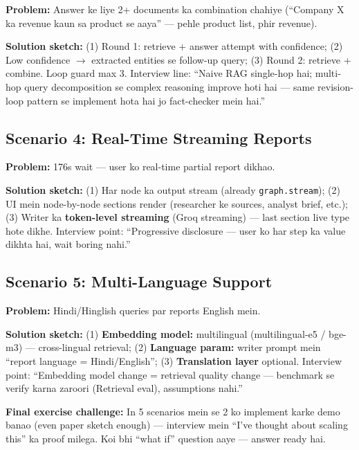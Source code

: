 \begin{conceptbox}
\textbf{Problem:} Answer ke liye 2+ documents ka combination chahiye (``Company X ka revenue kaun sa product se aaya'' --- pehle product list, phir revenue).

\textbf{Solution sketch:} (1) Round 1: retrieve + answer attempt with confidence; (2) Low confidence $\rightarrow$ extracted entities se follow-up query; (3) Round 2: retrieve + combine. Loop guard max 3. Interview line: ``Naive RAG single-hop hai; multi-hop query decomposition se complex reasoning improve hoti hai --- same revision-loop pattern se implement hota hai jo fact-checker mein hai.''
\end{conceptbox}

\subsection{Scenario 4: Real-Time Streaming Reports}

\begin{conceptbox}
\textbf{Problem:} 176s wait --- user ko real-time partial report dikhao.

\textbf{Solution sketch:} (1) Har node ka output stream (already \texttt{graph.stream}); (2) UI mein node-by-node sections render (researcher ke sources, analyst brief, etc.); (3) Writer ka \textbf{token-level streaming} (Groq streaming) --- last section live type hote dikhe. Interview point: ``Progressive disclosure --- user ko har step ka value dikhta hai, wait boring nahi.''
\end{conceptbox}

\subsection{Scenario 5: Multi-Language Support}

\begin{conceptbox}
\textbf{Problem:} Hindi/Hinglish queries par reports English mein.

\textbf{Solution sketch:} (1) \textbf{Embedding model:} multilingual (multilingual-e5 / bge-m3) --- cross-lingual retrieval; (2) \textbf{Language param:} writer prompt mein ``report language = Hindi/English''; (3) \textbf{Translation layer} optional. Interview point: ``Embedding model change = retrieval quality change --- benchmark se verify karna zaroori (Retrieval eval), assumptions nahi.''
\end{conceptbox}

\begin{memorybox}
\textbf{Final exercise challenge:} In 5 scenarios mein se 2 ko implement karke demo banao (even paper sketch enough) --- interview mein ``I've thought about scaling this'' ka proof milega. Koi bhi ``what if'' question aaye --- answer ready hai.
\end{memorybox}

